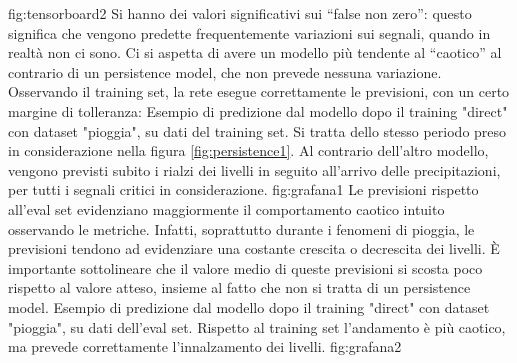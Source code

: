 {fig:tensorboard2}
Si hanno dei valori significativi sui “false non zero”: questo significa che vengono predette frequentemente variazioni sui segnali, quando in realtà non ci sono. Ci si aspetta di avere un modello più tendente al “caotico” al contrario di un persistence model, che non prevede nessuna variazione. Osservando il training set, la rete esegue correttamente le previsioni, con un certo margine di tolleranza:
{Esempio di predizione  dal modello dopo il training "direct" con dataset "pioggia", su dati del training set. Si tratta dello stesso periodo preso in considerazione nella figura \ref{fig:persistence1}. Al contrario dell'altro modello, vengono previsti subito i rialzi dei livelli in seguito all'arrivo delle precipitazioni, per tutti i segnali critici in considerazione. } 
{fig:grafana1}
Le previsioni rispetto all’eval set evidenziano maggiormente il comportamento caotico intuito osservando le metriche. Infatti, soprattutto durante i fenomeni di pioggia, le previsioni tendono ad evidenziare una costante crescita o decrescita dei livelli. È importante sottolineare che il valore medio di queste previsioni si scosta poco rispetto al valore atteso, insieme al fatto che non si tratta di un persistence model.
{Esempio di predizione  dal modello dopo il training "direct" con dataset "pioggia", su dati dell'eval set. Rispetto al training set l'andamento è più caotico, ma prevede correttamente l'innalzamento dei livelli.} 
{fig:grafana2}
